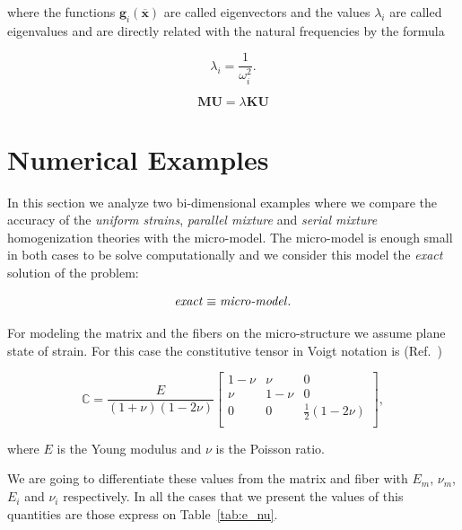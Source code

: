 \documentclass[review]{elsarticle}
\begin{document}
\noindent
where the functions $\bm{g}_i(\overline{\bm{x}})$ are called eigenvectors and the
values $\lambda_i$ are called eigenvalues and are directly related with the
natural frequencies by the formula

\begin{equation}
\lambda_i = \frac{1}{\omega_i^2}.
\label{eq:motion}
\end{equation}

\begin{equation}
\bm{M}\bm{U} = \lambda \bm{K}\bm{U}
\label{eq:equil_matricial}
\end{equation}


\section{Numerical Examples}

In this section we analyze two bi-dimensional examples where we compare the accuracy of
the \emph{uniform strains}, \emph{parallel mixture} and \emph{serial mixture}
homogenization theories with the micro-model. The micro-model is enough small in
both cases to be solve computationally and we consider this model the
\emph{exact} solution of the problem:

$$\text{\emph{exact}} \equiv \text{\emph{micro-model}}.$$

For modeling the matrix and the fibers on the micro-structure we assume plane
state of strain. For this case the constitutive tensor in Voigt notation is 
(Ref.~\cite{chavez_continuo})

\begin{equation}
\mathbb{C} = 
\frac{E}{(1+\nu)(1-2\nu)}
  \begin{bmatrix}
  1-\nu    & \nu      & 0                  \\
  \nu      & 1-\nu    & 0                  \\
  0        & 0        & \frac{1}{2}(1-2\nu)\\
  \end{bmatrix},
\end{equation}

\noindent
where $E$ is the Young modulus and $\nu$ is the Poisson ratio.

We are going to differentiate these values from the matrix and fiber with $E_m$,
$\nu_m$, $E_i$ and $\nu_i$ respectively. In all the cases that we present the
values of this quantities are those express on Table~\ref{tab:e_nu}.
\end{document}
